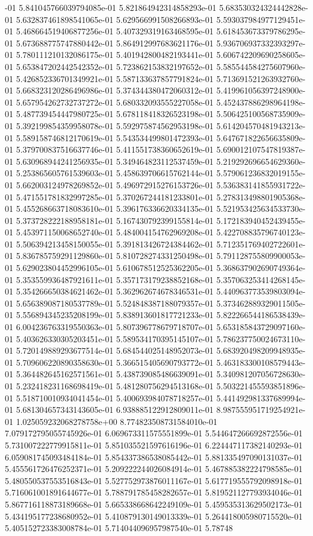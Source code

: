 -01	5.841045766039794085e-01	5.821864942314858293e-01	5.683530324324442828e-01	5.632837461898541065e-01	5.629566991508266893e-01	5.593037984977129451e-01	5.468664519406877256e-01	5.407329319163468595e-01	5.618453673379786295e-01	5.673688775747880442e-01	5.864912997683621176e-01	5.936706937332393297e-01	5.780111210132086175e-01	5.401942800482193441e-01	5.606742209690258605e-01	5.653847202442542352e-01	5.723862153832197652e-01	5.585544584275607960e-01	5.426852336701349921e-01	5.587133637857791824e-01	5.713691521263932760e-01	5.668323120286496986e-01	5.374344380472060312e-01	5.419961056397248900e-01	5.657954262732737272e-01	5.680332093555227058e-01	5.452437886298964198e-01	5.487739454447980725e-01	5.678118418326523198e-01	5.506425100568735909e-01	5.392199854359958078e-01	5.592975874562953198e-01	5.614204570481943213e-01	5.589158746812170619e-01	5.543534499801472393e-01	5.647671822656635809e-01	5.379700837516637746e-01	5.411551738360652619e-01	5.690012107547819387e-01	5.630968944241256935e-01	5.349464823112537459e-01	5.219292696654629360e-01	5.253865605761539603e-01	5.458639706615762144e-01	5.579061236832019155e-01	5.662003124978269852e-01	5.496972915276153726e-01	5.536383141855931722e-01	5.471551781832997285e-01	5.370267244181233801e-01	5.278313498801905368e-01	5.455268663718083610e-01	5.396176336620334135e-01	5.521953425634533730e-01	5.373728222188958181e-01	5.167430792399155814e-01	5.172183940452439455e-01	5.453971150068652740e-01	5.484004154762969208e-01	5.422708835796740123e-01	5.506394213458150055e-01	5.391813426724384462e-01	5.712351769402722601e-01	5.836785759291129860e-01	5.810728274331250498e-01	5.791128755809900053e-01	5.629023804452996105e-01	5.610678512525362205e-01	5.368637902690749364e-01	5.353559936487921611e-01	5.357173179238852168e-01	5.357063253414268145e-01	5.354266650384621462e-01	5.362962674678346531e-01	5.440963773539803094e-01	5.656389087180537789e-01	5.524848387188079357e-01	5.373462889329011505e-01	5.556894345235208199e-01	5.838913601817721233e-01	5.822266544186538439e-01	6.004236763319550363e-01	5.807396778679718707e-01	5.653185843729097160e-01	5.403626330305203451e-01	5.589534170395145107e-01	5.786237750024673110e-01	5.720149889293677514e-01	5.684544025148952073e-01	5.683920498209948935e-01	5.709606220890358630e-01	5.366515405690793772e-01	5.463183300108579443e-01	5.364482645162571561e-01	5.438739085486639091e-01	5.340981207056728630e-01	5.232418231168698419e-01	5.481280756294513168e-01	5.503221455593851896e-01	5.518710010934041454e-01	5.400693984078718257e-01	5.441492981337689994e-01	5.681304657343143605e-01	6.938885122912809011e-01	8.987555951719254921e-01	1.025059232068278758e+00	8.774823508731584010e-01	7.079172795055745926e-01	6.069673311575551899e-01	5.544647266692872556e-01	5.731007222779915811e-01	5.851035521597616196e-01	6.224447117382140293e-01	6.059081745093484184e-01	5.854337386538085442e-01	5.881335497090131037e-01	5.455561726476252371e-01	5.209222244026084914e-01	5.467885382224798585e-01	5.480550537553516843e-01	5.527752973876011167e-01	5.617719555792098918e-01	5.716061001891644677e-01	5.788791785458282657e-01	5.819521127793934046e-01	5.867716118873189668e-01	5.665338668642249109e-01	5.459535313629502173e-01	5.434195177238680952e-01	5.410879130149013339e-01	5.264418005980715520e-01	5.405152723383008784e-01	5.714044096957987540e-01	5.78748